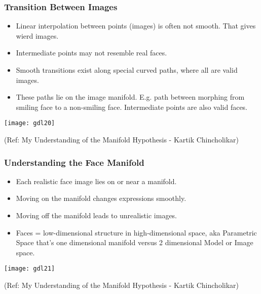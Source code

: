 \begin{frame}[fragile]\frametitle{Transition Between Images}
    \begin{itemize}
        \item Linear interpolation between points (images) is often not smooth. That gives wierd images.
        \item Intermediate points may not resemble real faces.
        \item Smooth transitions exist along special curved paths, where all are valid images.
        \item These paths lie on the image manifold. E.g. path between morphing from smiling face  to a non-smiling face. Intermediate points are also valid faces.
    \end{itemize}
	
\begin{center}
\texttt{[image: gdl20]}

{\tiny (Ref: My Understanding of the Manifold Hypothesis - Kartik Chincholikar)}	

\end{center}	


\end{frame}

\begin{frame}[fragile]\frametitle{Understanding the Face Manifold}
    \begin{itemize}
        \item Each realistic face image lies on or near a manifold.
        \item Moving on the manifold changes expressions smoothly.
        \item Moving off the manifold leads to unrealistic images.
        \item Faces = low-dimensional structure in high-dimensional space, aka Parametric Space that's one dimensional manifold versus 2 dimensional Model or Image space.
    \end{itemize}
	
\begin{center}
\texttt{[image: gdl21]}

{\tiny (Ref: My Understanding of the Manifold Hypothesis - Kartik Chincholikar)}	

\end{center}		
\end{frame}

